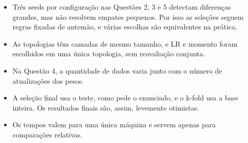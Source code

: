 \begin{itemize}
  \item Três seeds por configuração nas Questões 2, 3 e 5 detectam diferenças grandes, mas não resolvem empates pequenos. Por isso as seleções seguem regras fixadas de antemão, e várias escolhas são equivalentes na prática.
  \item As topologias têm camadas de mesmo tamanho, e LR e momento foram escolhidos em uma única topologia, sem reavaliação conjunta.
  \item Na Questão 4, a quantidade de dados varia junto com o número de atualizações dos pesos.
  \item A seleção final usa o teste, como pede o enunciado, e o k-fold usa a base inteira. Os resultados finais são, assim, levemente otimistas.
  \item Os tempos valem para uma única máquina e servem apenas para comparações relativas.
\end{itemize}
